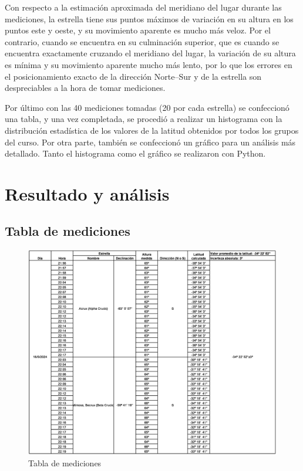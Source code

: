\documentclass[11pt, a4paper]{article} %
\begin{document}
Con respecto a la estimación aproximada del meridiano del lugar durante las mediciones, la estrella tiene sus puntos máximos de variación en su altura en los puntos este y oeste, y su movimiento aparente es mucho más veloz. Por el contrario, cuando se encuentra en su culminación superior, que es cuando se encuentra exactamente cruzando el meridiano del lugar, la variación de su altura es mínima y su movimiento aparente mucho más lento, por lo que los errores en el  posicionamiento exacto de la dirección Norte–Sur y de la estrella son despreciables a la hora de tomar mediciones.

Por último con las 40 mediciones tomadas (20 por cada estrella) se confeccionó una tabla, y una vez completada, se procedió a realizar un histograma con la distribución estadística de los valores de la latitud obtenidos por todos los grupos del curso. Por otra parte, también se confeccionó un gráfico para un análisis más detallado. Tanto el histograma como el gráfico se realizaron con Python.


\section{Resultado y análisis}
\subsection{Tabla de mediciones}
\begin{figure}[H]
    \centering
    \includegraphics[width=15cm]{images/tabla-TP-1-Ian_Chen_y_Lola_Cavalieri .jpg}
    \caption{Tabla de mediciones}
    \label{fig:tabla-mediciones}
\end{figure}
\end{document}
